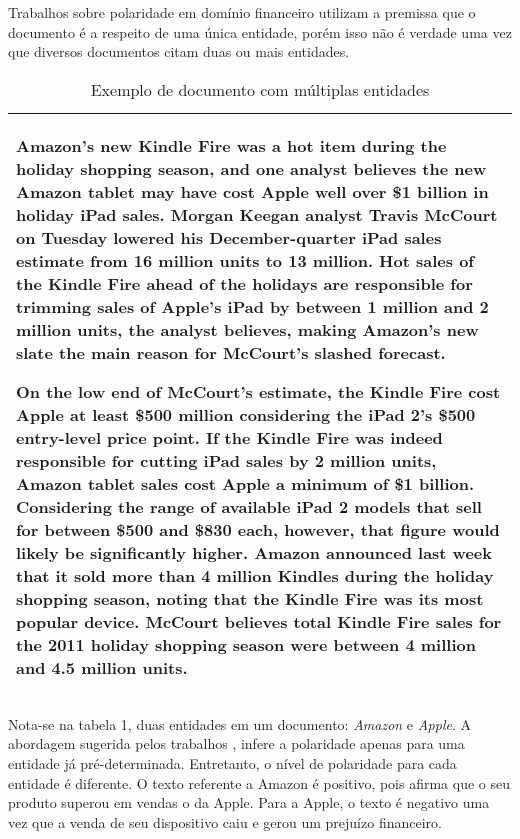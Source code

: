 \documentclass[a4paper,12pt]{article}
\begin{document}
Trabalhos sobre polaridade em domínio financeiro \newline \cite{pablotese,jbhx,azsystem} utilizam a premissa que o documento é a respeito de uma única entidade, porém isso não é verdade uma vez que diversos documentos citam duas ou mais entidades. 


\begin{table}[h!]
\begin{tabular}{|l|}
\hline
\begin{minipage}[t]{1.0\columnwidth}

Amazon’s new Kindle Fire was a hot item during the holiday shopping season, and one analyst believes the new Amazon tablet may have cost Apple well over \$1 billion in holiday iPad sales. Morgan Keegan analyst Travis McCourt on Tuesday lowered his December-quarter iPad sales estimate from 16 million units to 13 million. 
Hot sales of the Kindle Fire ahead of the holidays are responsible for trimming sales of Apple’s iPad by between 1 million and 2 million units, the analyst believes, making Amazon’s new slate the main reason for McCourt’s slashed forecast.

On the low end of McCourt’s estimate, the Kindle Fire cost Apple at least \$500 million considering the iPad 2's \$500 entry-level price point. If the Kindle Fire was indeed responsible for cutting iPad sales by 2 million units, Amazon tablet sales cost Apple a minimum of \$1 billion. Considering the range of available iPad 2 models that sell for between \$500 and \$830 each, however, that figure would likely be significantly higher.
Amazon announced last week that it sold more than 4 million Kindles during the holiday shopping season, noting that the Kindle Fire was its most popular device. McCourt believes total Kindle Fire sales for the 2011 holiday shopping season were between 4 million and 4.5 million units.

\end{minipage}\tabularnewline
\hline
\end{tabular}
\caption{Exemplo de documento com múltiplas entidades}
\end{table}

Nota-se na tabela 1, duas entidades em um documento: \textit{Amazon} e \textit{Apple}. A abordagem sugerida pelos trabalhos \cite{pablotese,cohesion}, infere a polaridade apenas para uma entidade já pré-determinada. Entretanto, o nível de polaridade para cada entidade é diferente. O texto referente a Amazon é positivo, pois afirma que o seu produto superou em vendas o da Apple. Para a Apple, o texto é negativo uma vez que a venda de seu dispositivo caiu e gerou um prejuízo financeiro.
\end{document}
